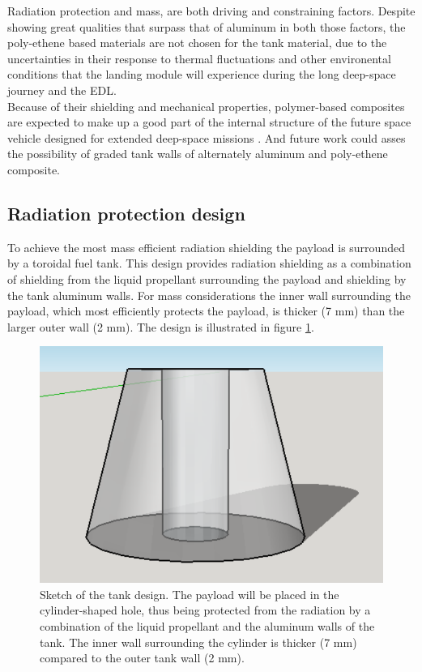 \noindent
Radiation protection and mass, are both driving and constraining factors. Despite showing great qualities that surpass that of aluminum in both those factors, the poly-ethene based materials are not chosen for the tank material, due to the uncertainties in their response to thermal fluctuations and other environental conditions that the landing module will experience during the long deep-space journey and the EDL. \\

\noindent
Because of their shielding and mechanical properties, polymer-based composites
are expected to make up a good part of the internal structure of the future space vehicle designed for
extended deep-space missions  \cite{rad_shield_2006}. And future work could asses the possibility of graded tank walls of alternately aluminum and poly-ethene composite. 


\subsection{Radiation protection design}
To achieve the most mass efficient radiation shielding the payload is surrounded by a toroidal fuel tank. This design provides radiation shielding as a combination of shielding from the liquid propellant surrounding the payload and shielding by the tank aluminum walls. For mass considerations the inner wall surrounding the payload, which most efficiently protects the payload, is thicker (7 mm) than the larger outer wall (2 mm). The design is illustrated in figure \ref{fig:tankdesign}.

\begin{figure}[htb]
\begin{center}
\includegraphics[scale=0.7]{figures/navtheory/tank}
\caption{Sketch of the tank design. The payload will be placed in the cylinder-shaped hole, thus being protected from the radiation by a combination of the liquid propellant and the aluminum walls of the tank. The inner wall surrounding the cylinder is thicker (7 mm) compared to the outer tank wall (2 mm). }
\label{fig:tankdesign}
\end{center}
\end{figure}

